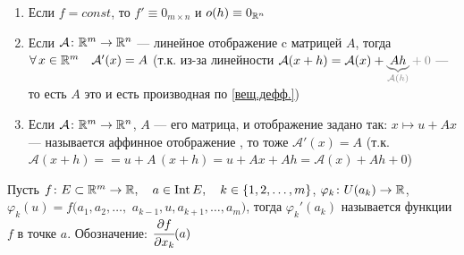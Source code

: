 \pagebreak

\begin{zam}[https://www.youtube.com/live/4EMkUsyQQec?si=cueUh21MoVTF1M0v&t=9813]
	\begin{enumerate} %
		\item Если $f = const$, то $f' \equiv 0_{m \times n}$ и $o(h) \equiv 0_{\mathbb R^n}$
		
		\item Если $\mathcal{A} \colon \mathbb R^m \to \mathbb R^n$ --- линейное отображение c матрицей $A$, тогда $\forall \, x \in \mathbb R^m \quad \mathcal{A}'(x) = A$ (т.к. из-за линейности $\mathcal{A}(x + h) = \mathcal{A}(x) + \unbr{Ah}{\mathcal A(h)} \uns{{}+0}$ --- то есть $A$ это и есть производная по \ref{вещ.дефф.})
		
		\item Если $\mathcal{A} \colon \mathbb R^m \to \mathbb R^n$, $A$ --- его матрица, и отображение задано так: $x \mapsto u + Ax$ --- называется аффинное отображение , то тоже $\mathcal{A}'(x) = A$ (т.к. $\mathcal{A}(x + h) =$\linebreak $= u + A\,(x+h) = u + Ax + Ah = \mathcal{A}(x) + Ah + 0$)
	\end{enumerate}
\end{zam} %

\begin{opr}\label{част.пр.} %
	Пусть\quad 
	$f \colon E \subset \mathbb R^m \to \mathbb R,\quad a \in \mathrm{Int}\, E,\quad k \in \{1, 2, \dots, m\}$,\quad
	$\varphi_k \colon U(a_k) \to \mathbb R$,\quad 
	$\varphi_k(u) = f(a_1, a_2, \dots,$ $a_{k-1}, u, a_{k + 1}, \dots, a_m)$,
	тогда $\varphi_k'(a_k)$
	называется
	функции $f$ в точке $a$.
	Обозначение: $\cfrac{\partial f}{\partial x_k}(a)$
\end{opr} %

